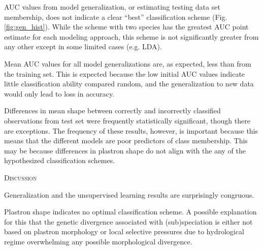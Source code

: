 \documentclass[12pt,letterpaper]{article}
\renewcommand{\section}[1]{%
\bigskip
\begin{center}
\begin{Large}
\normalfont\scshape #1
\medskip
\end{Large}
\end{center}}
\begin{document}
AUC values from model generalization, or estimating testing data set membership, does not indicate a clear ``best'' classification scheme (Fig. \ref{fig:gen_hist}). While the scheme with two species has the greatest AUC point estimate for each modeling approach, this scheme is not significantly greater from any other except in some limited cases (e.g. LDA). 

Mean AUC values for all model generalizations are, as expected, less than from the training set. This is expected because the low initial AUC values indicate little classification ability compared random, and the generalization to new data would only lead to loss in accuracy.



Differences in mean shape between correctly and incorrectly classified observations from test set were frequently statistically significant, though there are exceptions. The frequency of these results, however, is important because this means that the different models are poor predictors of class membership. This may be because differences in plastron shape do not align with the any of the hypothesized classification schemes.




\section{Discussion}

Generalization and the unsupervised learning results are surprisingly congruous.

Plastron shape indicates no optimal classification scheme. A possible explanation for this that the genetic divergence associated with (sub)speciation is either not based on plastron morphology or local selective pressures due to hydrological regime overwhelming any possible morphological divergence.


\clearpage



\clearpage
\end{document}
